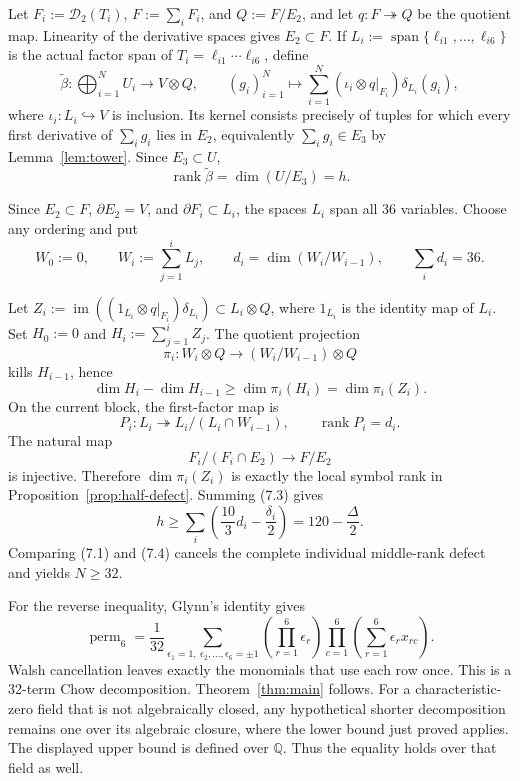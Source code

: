 \documentclass[11pt]{amsart}
\newcommand{\Q}{\mathbb{Q}}
\newcommand{\Span}{\operatorname{span}}
\newcommand{\im}{\operatorname{im}}
\newcommand{\rank}{\operatorname{rank}}
\newcommand{\perm}{\operatorname{perm}}
\newcommand{\cD}{\mathcal{D}}
\theoremstyle{definition}
\begin{document}
Let \(F_i:=\cD_2(T_i)\), \(F:=\sum_iF_i\), and \(Q:=F/E_2\), and let
\(q:F\twoheadrightarrow Q\) be the quotient map. Linearity of the
derivative spaces gives \(E_2\subset F\). If
\(L_i:=\Span\{\ell_{i1},\ldots,\ell_{i6}\}\) is the actual factor span of
\(T_i=\ell_{i1}\cdots\ell_{i6}\), define
\[
 \widetilde\beta:\bigoplus_{i=1}^NU_i\longrightarrow V\otimes Q,
 \qquad (g_i)_{i=1}^N\longmapsto
 \sum_{i=1}^N(\iota_i\otimes q|_{F_i})\delta_{L_i}(g_i),
\]
where \(\iota_i:L_i\hookrightarrow V\) is inclusion.
Its kernel consists precisely of tuples for which every first derivative of
\(\sum_i g_i\) lies in \(E_2\), equivalently
\(\sum_i g_i\in E_3\) by Lemma~\ref{lem:tower}. Since \(E_3\subset U\),
\[
 \rank\widetilde\beta=\dim(U/E_3)=h. \tag{7.2}
\]

Since
\(E_2\subset F\), \(\partial E_2=V\), and \(\partial F_i\subset L_i\),
the spaces \(L_i\) span all 36 variables. Choose any ordering and put
\[
 W_0:=0,\qquad W_i:=\sum_{j=1}^iL_j,
 \qquad d_i=\dim(W_i/W_{i-1}),
 \qquad\sum_i d_i=36.
\]

Let
\(Z_i:=\im((1_{L_i}\otimes q|_{F_i})\delta_{L_i})\subset L_i\otimes Q\),
where \(1_{L_i}\) is the identity map of \(L_i\). Set
\(H_0:=0\) and \(H_i:=\sum_{j=1}^iZ_j\). The quotient projection
\[
 \pi_i:W_i\otimes Q\longrightarrow(W_i/W_{i-1})\otimes Q
\]
kills \(H_{i-1}\), hence
\[
 \dim H_i-\dim H_{i-1}\ge\dim\pi_i(H_i)=\dim\pi_i(Z_i). \tag{7.3}
\]
On the current block, the first-factor map is
\[
 P_i:L_i\twoheadrightarrow L_i/(L_i\cap W_{i-1}),
 \qquad\rank P_i=d_i.
\]
The natural map
\[
 F_i/(F_i\cap E_2)\longrightarrow F/E_2
\]
is injective. Therefore \(\dim\pi_i(Z_i)\) is exactly the local symbol rank
in Proposition~\ref{prop:half-defect}. Summing (7.3) gives
\[
 \boxed{h\ge\sum_i\left(\frac{10}{3}d_i-\frac{\delta_i}{2}\right)
 =120-\frac\Delta2.} \tag{7.4}
\]
Comparing (7.1) and (7.4) cancels the complete individual middle-rank defect
and yields \(N\ge32\).

For the reverse inequality, Glynn's identity \cite{Glynn2010} gives
\[
 \perm_6=\frac1{32}
 \sum_{\epsilon_1=1,\ \epsilon_2,\ldots,\epsilon_6=\pm1}
 \left(\prod_{r=1}^6\epsilon_r\right)
 \prod_{c=1}^6\left(\sum_{r=1}^6\epsilon_rx_{rc}\right).
\]
Walsh cancellation leaves exactly the monomials that use each row once. This
is a 32-term Chow decomposition. Theorem~\ref{thm:main} follows.
For a characteristic-zero field that is not algebraically closed, any
hypothetical shorter decomposition remains one over its algebraic closure,
where the lower bound just proved applies. The displayed upper bound is
defined over \(\Q\). Thus the equality holds over that field as well.
\end{document}
